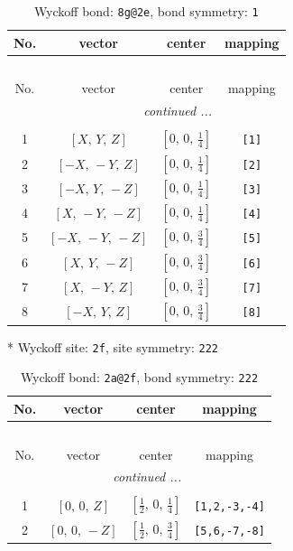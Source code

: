 \documentclass[fleqn,8pt]{jsarticle}
\begin{document}
\renewcommand{\arraystretch}{1.2}
\begin{longtable}{cccc}
\caption{Wyckoff bond: {\tt 8g@2e}, bond symmetry: {\tt 1}}
 \\
 \hline \hline
No. & vector & center & mapping \\ \hline \endfirsthead

\multicolumn{3}{l}{\tablename\ \thetable{}} \\
 \hline \hline
No. & vector & center & mapping \\ \hline \endhead

 \hline \hline
\multicolumn{3}{r}{\footnotesize\it continued ...} \\ \endfoot

 \hline \hline
\multicolumn{3}{r}{} \\ \endlastfoot

1 & $\left[ X,\, Y,\, Z \right]$ & $\left[ 0,\, 0,\, \frac{1}{4} \right]$ & {\tt [1]} \\ \hline
2 & $\left[ - X,\, - Y,\, Z \right]$ & $\left[ 0,\, 0,\, \frac{1}{4} \right]$ & {\tt [2]} \\ \hline
3 & $\left[ - X,\, Y,\, - Z \right]$ & $\left[ 0,\, 0,\, \frac{1}{4} \right]$ & {\tt [3]} \\ \hline
4 & $\left[ X,\, - Y,\, - Z \right]$ & $\left[ 0,\, 0,\, \frac{1}{4} \right]$ & {\tt [4]} \\ \hline
5 & $\left[ - X,\, - Y,\, - Z \right]$ & $\left[ 0,\, 0,\, \frac{3}{4} \right]$ & {\tt [5]} \\ \hline
6 & $\left[ X,\, Y,\, - Z \right]$ & $\left[ 0,\, 0,\, \frac{3}{4} \right]$ & {\tt [6]} \\ \hline
7 & $\left[ X,\, - Y,\, Z \right]$ & $\left[ 0,\, 0,\, \frac{3}{4} \right]$ & {\tt [7]} \\ \hline
8 & $\left[ - X,\, Y,\, Z \right]$ & $\left[ 0,\, 0,\, \frac{3}{4} \right]$ & {\tt [8]} \\
\end{longtable}
* Wyckoff site: {\tt 2f}, site symmetry: {\tt 222}
\renewcommand{\arraystretch}{1.2}
\begin{longtable}{cccc}
\caption{Wyckoff bond: {\tt 2a@2f}, bond symmetry: {\tt 222}}
 \\
 \hline \hline
No. & vector & center & mapping \\ \hline \endfirsthead

\multicolumn{3}{l}{\tablename\ \thetable{}} \\
 \hline \hline
No. & vector & center & mapping \\ \hline \endhead

 \hline \hline
\multicolumn{3}{r}{\footnotesize\it continued ...} \\ \endfoot

 \hline \hline
\multicolumn{3}{r}{} \\ \endlastfoot

1 & $\left[ 0,\, 0,\, Z \right]$ & $\left[ \frac{1}{2},\, 0,\, \frac{1}{4} \right]$ & {\tt [1,2,-3,-4]} \\ \hline
2 & $\left[ 0,\, 0,\, - Z \right]$ & $\left[ \frac{1}{2},\, 0,\, \frac{3}{4} \right]$ & {\tt [5,6,-7,-8]} \\
\end{longtable}
\end{document}
